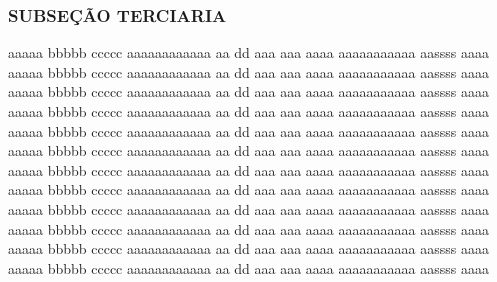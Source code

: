 \subsubsection{SUBSEÇÃO TERCIARIA }
aaaaa bbbbb ccccc aaaaaaaaaaaa aa dd  aaa aaa aaaa aaaaaaaaaaa aassss aaaa
aaaaa bbbbb ccccc aaaaaaaaaaaa aa dd  aaa aaa aaaa aaaaaaaaaaa aassss aaaa
aaaaa bbbbb ccccc aaaaaaaaaaaa aa dd  aaa aaa aaaa aaaaaaaaaaa aassss aaaa
aaaaa bbbbb ccccc aaaaaaaaaaaa aa dd  aaa aaa aaaa aaaaaaaaaaa aassss aaaa
aaaaa bbbbb ccccc aaaaaaaaaaaa aa dd  aaa aaa aaaa aaaaaaaaaaa aassss aaaa
aaaaa bbbbb ccccc aaaaaaaaaaaa aa dd  aaa aaa aaaa aaaaaaaaaaa aassss aaaa
aaaaa bbbbb ccccc aaaaaaaaaaaa aa dd  aaa aaa aaaa aaaaaaaaaaa aassss aaaa
aaaaa bbbbb ccccc aaaaaaaaaaaa aa dd  aaa aaa aaaa aaaaaaaaaaa aassss aaaa
aaaaa bbbbb ccccc aaaaaaaaaaaa aa dd  aaa aaa aaaa aaaaaaaaaaa aassss aaaa
aaaaa bbbbb ccccc aaaaaaaaaaaa aa dd  aaa aaa aaaa aaaaaaaaaaa aassss aaaa
aaaaa bbbbb ccccc aaaaaaaaaaaa aa dd  aaa aaa aaaa aaaaaaaaaaa aassss aaaa
aaaaa bbbbb ccccc aaaaaaaaaaaa aa dd  aaa aaa aaaa aaaaaaaaaaa aassss aaaa
